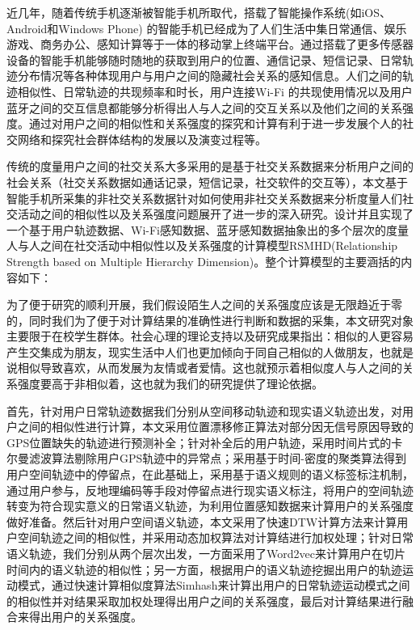 \begin{cabstract}
近几年，随着传统手机逐渐被智能手机所取代，搭载了智能操作系统(如iOS、Android和Windows Phone) 的智能手机已经成为了人们生活中集日常通信、娱乐游戏、商务办公、感知计算等于一体的移动掌上终端平台。通过搭载了更多传感器设备的智能手机能够随时随地的获取到用户的位置、通信记录、短信记录、日常轨迹分布情况等各种体现用户与用户之间的隐藏社会关系的感知信息。人们之间的轨迹相似性、日常轨迹的共现频率和时长，用户连接Wi-Fi 的共现使用情况以及用户蓝牙之间的交互信息都能够分析得出人与人之间的交互关系以及他们之间的关系强度。通过对用户之间的相似性和关系强度的探究和计算有利于进一步发展个人的社交网络和探究社会群体结构的发展以及演变过程等。

传统的度量用户之间的社交关系大多采用的是基于社交关系数据来分析用户之间的社会关系（社交关系数据如通话记录，短信记录，社交软件的交互等），本文基于智能手机所采集的非社交关系数据针对如何使用非社交关系数据来分析度量人们社交活动之间的相似性以及关系强度问题展开了进一步的深入研究。设计并且实现了一个基于用户轨迹数据、Wi-Fi感知数据、蓝牙感知数据抽象出的多个层次的度量人与人之间在社交活动中相似性以及关系强度的计算模型RSMHD(Relationship Strength based on Multiple Hierarchy Dimension)。整个计算模型的主要涵括的内容如下：
\par 为了便于研究的顺利开展，我们假设陌生人之间的关系强度应该是无限趋近于零的，同时我们为了便于对计算结果的准确性进行判断和数据的采集，本文研究对象主要限于在校学生群体。社会心理的理论支持以及研究成果指出：相似的人更容易产生交集成为朋友，现实生活中人们也更加倾向于同自己相似的人做朋友，也就是说相似导致喜欢，从而发展为友情或者爱情。这也就预示着相似度人与人之间的关系强度要高于非相似着，这也就为我们的研究提供了理论依据。
\par 首先，针对用户日常轨迹数据我们分别从空间移动轨迹和现实语义轨迹出发，对用户之间的相似性进行计算，本文采用位置漂移修正算法对部分因无信号原因导致的GPS位置缺失的轨迹进行预测补全；针对补全后的用户轨迹，采用时间片式的卡尔曼滤波算法剔除用户GPS轨迹中的异常点；采用基于时间-密度的聚类算法得到用户空间轨迹中的停留点，在此基础上，采用基于语义规则的语义标签标注机制，通过用户参与，反地理编码等手段对停留点进行现实语义标注，将用户的空间轨迹转变为符合现实意义的日常语义轨迹，为利用位置感知数据来计算用户的关系强度做好准备。然后针对用户空间语义轨迹，本文采用了快速DTW计算方法来计算用户空间轨迹之间的相似性，并采用动态加权算法对计算结进行加权处理；针对日常语义轨迹，我们分别从两个层次出发，一方面采用了Word2vec来计算用户在切片时间内的语义轨迹的相似性；另一方面，根据用户的语义轨迹挖掘出用户的轨迹运动模式，通过快速计算相似度算法Simhash来计算出用户的日常轨迹运动模式之间的相似性并对结果采取加权处理得出用户之间的关系强度，最后对计算结果进行融合来得出用户的关系强度。


\end{cabstract}

